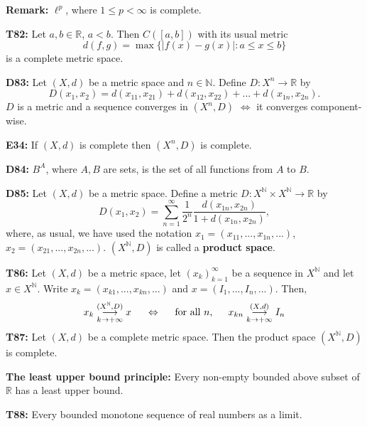 \documentclass[twocolumn,10pt]{article}
\begin{document}
\textbf{Remark:} $\ell^p$, where $1\leq p<\infty$ is complete.

\textbf{T82:} Let $a,b\in\mathbb{R}$, $a<b$. Then $C([a,b])$ with its usual metric
\begin{equation*}
    d(f,g) = \max\{|f(x)-g(x)| : a\leq x\leq b\}
\end{equation*}
is a complete metric space.

\textbf{D83:} Let $(X,d)$ be a metric space and $n\in\mathbb{N}$. Define $D:X^n\to\mathbb{R}$ by
\begin{equation*}
    D(x_1,x_2) = d(x_{11},x_{21}) + d(x_{12},x_{22}) + ... + d(x_{1n},x_{2n}).
\end{equation*}
$D$ is a metric and a sequence converges in $(X^n,D)$ $\Leftrightarrow$ it converges component-wise.

\textbf{E34:} If $(X,d)$ is complete then $(X^n,D)$ is complete.

\textbf{D84:} $B^A$, where $A,B$ are sets, is the set of all functions from $A$ to $B$.

\textbf{D85:} Let $(X,d)$ be a metric space. Define a metric $D:X^{\mathbb{N}}\times X^{\mathbb{N}}\to\mathbb{R}$ by
\begin{equation*}
    D(x_1,x_2) = \sum_{n=1}^{\infty} \frac{1}{2^n}\frac{d(x_{1n},x_{2n})}{1+d(x_{1n},x_{2n})},
\end{equation*}
where, as usual, we have used the notation $x_1=(x_{11},...,x_{1n},...)$, $x_2=(x_{21},...,x_{2n},...)$. $(X^{\mathbb{N}},D)$ is called a \textbf{product space}.

\textbf{T86:} Let $(X,d)$ be a metric space, let $(x_k)_{k=1}^{\infty}$ be a sequence in $X^{\mathbb{N}}$ and let $x\in X^{\mathbb{N}}$. Write $x_k=(x_{k1},...,x_{kn},...)$ and $x=(I_1,...,I_n,...)$. Then,
\begin{equation*}
    x_k \underset{k\to+\infty}{\overset{(X^{\mathbb{N}},D)}{\longrightarrow}} x \hspace{0.5cm}\Leftrightarrow\hspace{0.5cm} \text{for all } n, \hspace{0.5cm} x_{kn} \underset{k\to+\infty}{\overset{(X,d)}{\longrightarrow}} I_n
\end{equation*}
\textbf{T87:} Let $(X,d)$ be a complete metric space. Then the product space $(X^{\mathbb{N}},D)$ is complete.

\textbf{The least upper bound principle:} Every non-empty bounded above subset of $\mathbb{R}$ has a least upper bound.

\textbf{T88:} Every bounded monotone sequence of real numbers as a limit.
\end{document}
